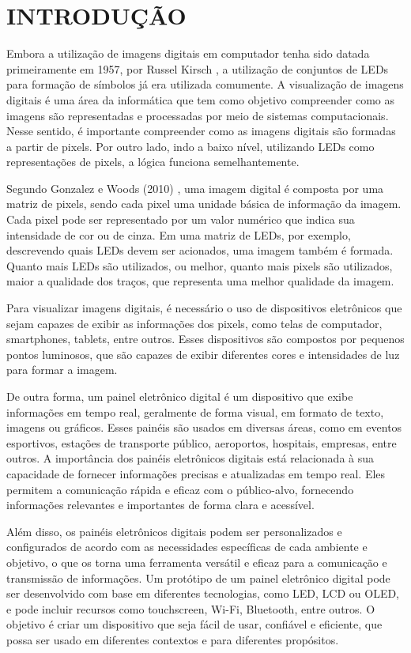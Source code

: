 \chapter{INTRODUÇÃO}

Embora a utilização de imagens digitais em computador tenha sido datada primeiramente em 1957, por Russel Kirsch \cite{historiaPixel}, a utilização de conjuntos de LEDs para formação de símbolos já era utilizada comumente. A visualização de imagens digitais é uma área da informática que tem como objetivo compreender como as imagens são representadas e processadas por meio de sistemas computacionais. Nesse sentido, é importante compreender como as imagens digitais são formadas a partir de pixels. Por outro lado, indo a baixo nível, utilizando LEDs como representações de pixels, a lógica funciona semelhantemente.

Segundo Gonzalez e Woods (2010) \cite{processamentoDigitalImagem}, uma imagem digital é composta por uma matriz de pixels, sendo cada pixel uma unidade básica de informação da imagem. Cada pixel pode ser representado por um valor numérico que indica sua intensidade de cor ou de cinza. Em uma matriz de LEDs, por exemplo, descrevendo quais LEDs devem ser acionados, uma imagem também é formada. Quanto mais LEDs são utilizados, ou melhor, quanto mais pixels são utilizados, maior a qualidade dos traços, que representa uma melhor qualidade da imagem.

Para visualizar imagens digitais, é necessário o uso de dispositivos eletrônicos que sejam capazes de exibir as informações dos pixels, como telas de computador, smartphones, tablets, entre outros. Esses dispositivos são compostos por pequenos pontos luminosos, que são capazes de exibir diferentes cores e intensidades de luz para formar a imagem. 

De outra forma, um painel eletrônico digital é um dispositivo que exibe informações em tempo real, geralmente de forma visual, em formato de texto, imagens ou gráficos. Esses painéis são usados em diversas áreas, como em eventos esportivos, estações de transporte público, aeroportos, hospitais, empresas, entre outros. A importância dos painéis eletrônicos digitais está relacionada à sua capacidade de fornecer informações precisas e atualizadas em tempo real. Eles permitem a comunicação rápida e eficaz com o público-alvo, fornecendo informações relevantes e importantes de forma clara e acessível.

Além disso, os painéis eletrônicos digitais podem ser personalizados e configurados de acordo com as necessidades específicas de cada ambiente e objetivo, o que os torna uma ferramenta versátil e eficaz para a comunicação e transmissão de informações. Um protótipo de um painel eletrônico digital pode ser desenvolvido com base em diferentes tecnologias, como LED, LCD ou OLED, e pode incluir recursos como touchscreen, Wi-Fi, Bluetooth, entre outros. O objetivo é criar um dispositivo que seja fácil de usar, confiável e eficiente, que possa ser usado em diferentes contextos e para diferentes propósitos.

